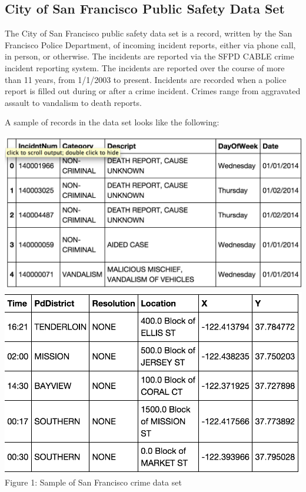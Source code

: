 \documentclass{article}
\begin{document}
\subsection{City of San Francisco Public Safety Data Set}

The City of San Francisco public safety data set is a record, written by the
San Francisco Police Department, of incoming incident reports, either via
phone call, in person, or otherwise. The incidents are reported via the
SFPD CABLE crime incident reporting system. The incidents are reported over
the course of more than 11 years, from 1/1/2003 to present. Incidents are
recorded when a police report is filled out during or after a crime
incident. Crimes range from aggravated assault to vandalism to death
reports.

A sample of records in the data set looks like the following:

\begin{center}
  \includegraphics[scale=0.5]{sf_city_sample_1.png} \\
  \includegraphics[scale=0.5]{sf_city_sample_2.png} \\
  Figure 1: Sample of San Francisco crime data set
\end{center}
\end{document}
